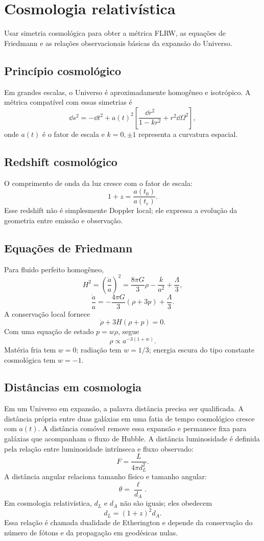 \documentclass[12pt,a4paper,oneside]{book}
\theoremstyle{rgplain}
\theoremstyle{rgremark}
\begin{document}
\chapter{Cosmologia relativística}
\label{cap:cosmologia}

\begin{objetivos}
Usar simetria cosmológica para obter a métrica FLRW, as equações de Friedmann e
as relações observacionais básicas da expansão do Universo.
\end{objetivos}

\section{Princípio cosmológico}

Em grandes escalas, o Universo é aproximadamente homogêneo e isotrópico. A
métrica compatível com essas simetrias é
\[
  \dd s^2=-\dd t^2+a(t)^2
  \left[
  \frac{\dd r^2}{1-kr^2}+r^2\dd\Omega^2
  \right],
\]
onde $a(t)$ é o fator de escala e $k=0,\pm1$ representa a curvatura espacial.

\section{Redshift cosmológico}

O comprimento de onda da luz cresce com o fator de escala:
\[
  1+z=\frac{a(t_0)}{a(t_e)}.
\]
Esse redshift não é simplesmente Doppler local; ele expressa a evolução da
geometria entre emissão e observação.

\section{Equações de Friedmann}

Para fluido perfeito homogêneo,
\[
  H^2=\left(\frac{\dot a}{a}\right)^2
  =
  \frac{8\pi G}{3}\rho-\frac{k}{a^2}+\frac{\Lambda}{3},
\]
\[
  \frac{\ddot a}{a}
  =
  -\frac{4\pi G}{3}(\rho+3p)+\frac{\Lambda}{3}.
\]
A conservação local fornece
\[
  \dot\rho+3H(\rho+p)=0.
\]
Com uma equação de estado $p=w\rho$, segue
\[
  \rho\propto a^{-3(1+w)}.
\]
Matéria fria tem $w=0$; radiação tem $w=1/3$; energia escura do tipo constante
cosmológica tem $w=-1$.

\section{Distâncias em cosmologia}

Em um Universo em expansão, a palavra distância precisa ser qualificada. A
distância própria entre duas galáxias em uma fatia de tempo cosmológico cresce
com $a(t)$. A distância comóvel remove essa expansão e permanece fixa para
galáxias que acompanham o fluxo de Hubble. A distância luminosidade é definida
pela relação entre luminosidade intrínseca e fluxo observado:
\[
  F=\frac{L}{4\pi d_L^2}.
\]
A distância angular relaciona tamanho físico e tamanho angular:
\[
  \theta=\frac{\ell}{d_A}.
\]
Em cosmologia relativística, $d_L$ e $d_A$ não são iguais; eles obedecem
\[
  d_L=(1+z)^2d_A.
\]
Essa relação é chamada dualidade de Etherington e depende da conservação do
número de fótons e da propagação em geodésicas nulas.
\end{document}
